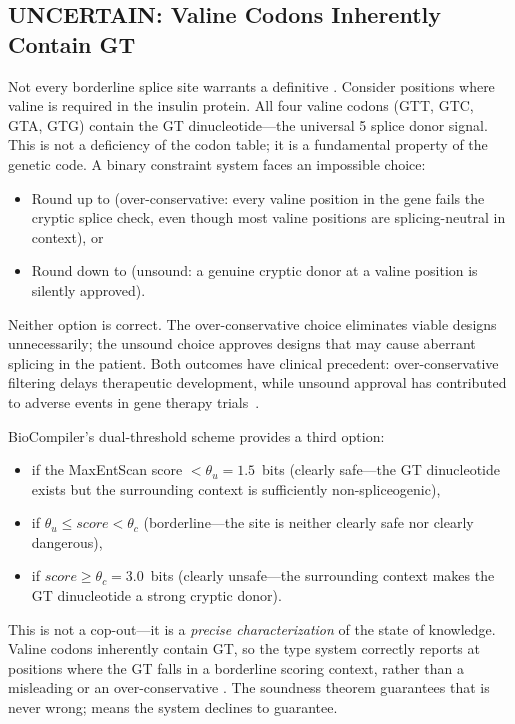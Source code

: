 \subsection{UNCERTAIN: Valine Codons Inherently Contain GT}

Not every borderline splice site warrants a definitive \FAIL.
Consider positions where valine is required in the insulin protein.
All four valine codons (GTT, GTC, GTA, GTG) contain the GT
dinucleotide---the universal 5\textquotesingle{} splice donor signal.
This is not a deficiency of the codon table; it is a fundamental
property of the genetic code.
A binary constraint system faces an impossible choice:
\begin{itemize}[leftmargin=*,itemsep=0pt,topsep=1pt]
\item Round up to \FAIL{} (over-conservative: every valine position
      in the gene fails the cryptic splice check, even though most
      valine positions are splicing-neutral in context), or
\item Round down to \PASS{} (unsound: a genuine cryptic donor at a
      valine position is silently approved).
\end{itemize}

Neither option is correct.
The over-conservative choice eliminates viable designs unnecessarily;
the unsound choice approves designs that may cause aberrant splicing
in the patient.
Both outcomes have clinical precedent: over-conservative filtering
delays therapeutic development, while unsound approval has contributed
to adverse events in gene therapy trials~\cite{hacein2018gene}.

BioCompiler's dual-threshold scheme provides a third option:
\begin{itemize}[leftmargin=*,itemsep=0pt,topsep=1pt]
\item \PASS{} if the MaxEntScan score $< \theta_u = 1.5$~bits
      (clearly safe---the GT dinucleotide exists but the surrounding
      context is sufficiently non-spliceogenic),
\item \UNCERTAIN{} if $\theta_u \le \mathit{score} < \theta_c$
      (borderline---the site is neither clearly safe nor clearly
      dangerous),
\item \FAIL{} if $\mathit{score} \ge \theta_c = 3.0$~bits
      (clearly unsafe---the surrounding context makes the GT
      dinucleotide a strong cryptic donor).
\end{itemize}

This is not a cop-out---it is a \emph{precise characterization} of
the state of knowledge.
Valine codons inherently contain GT, so the type system correctly
reports \UNCERTAIN{} at positions where the GT falls in a borderline
scoring context, rather than a misleading \PASS{} or an
over-conservative \FAIL.
The soundness theorem guarantees that \PASS{} is never wrong;
\UNCERTAIN{} means the system declines to guarantee.

